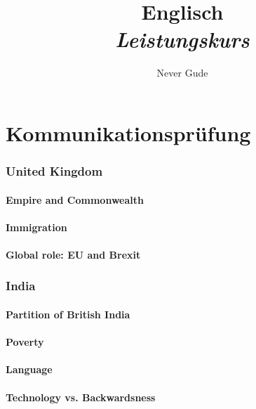 \documentclass[10pt]{article}
\begin{document}
\title{{Englisch}\\{\normalsize{\itshape Leistungskurs}}}
	\author{Never Gude}
	\maketitle
	\newpage
	\pagestyle{fancynotes}

\part{Kommunikationsprüfung}
	\label{part:kompruef}
\section{United Kingdom}
	\label{sec:uk}
\subsection{Empire and Commonwealth}
	\label{ssec:uk@empire}
\subsection{Immigration}
	\label{ssec:uk@immig}
\subsection{Global role: EU and Brexit}
	\label{ssec:uk@brexit}

\section{India}
	\label{sec:india}
\subsection{Partition of British India}
	\label{ssec:india@britindia}
\subsection{Poverty}
	\label{ssec:india@poverty}
\subsection{Language}
	\label{ssec:india@language}
\subsection{Technology vs. Backwardsness}
	\label{ssec:india@tech}
\end{document}
